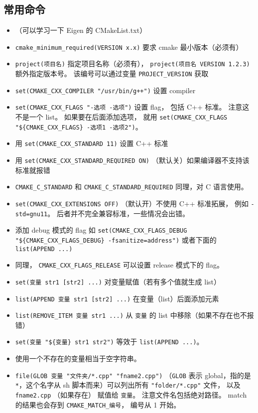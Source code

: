 \subsection{常用命令}
\begin{itemize}
\item （可以学习一下 Eigen 的 CMakeList.txt）
\item \verb`cmake_minimum_required(VERSION x.x)` 要求 cmake 最小版本（必须有）
\item \verb`project(项目名)` 指定项目名称（必须有）， \verb`project(项目名 VERSION 1.2.3)` 额外指定版本号。 该编号可以通过变量 \verb`PROJECT_VERSION` 获取
\item \verb`set(CMAKE_CXX_COMPILER "/usr/bin/g++")` 设置 compiler
\item \verb`set(CMAKE_CXX_FLAGS "-选项 -选项")` 设置 flag， 包括 C++ 标准。 注意这不是一个 list。 如果要在后面添加选项， 就用 \verb`set(CMAKE_CXX_FLAGS "${CMAKE_CXX_FLAGS} -选项1 -选项2")`。
\item 用 \verb`set(CMAKE_CXX_STANDARD 11)` 设置 C++ 标准
\item 用 \verb`set(CMAKE_CXX_STANDARD_REQUIRED ON)` （默认关）如果编译器不支持该标准就报错
\item \verb`CMAKE_C_STANDARD` 和 \verb`CMAKE_C_STANDARD_REQUIRED` 同理，对 C 语言使用。
\item \verb`set(CMAKE_CXX_EXTENSIONS OFF)` （默认开）不使用 C++ 标准拓展， 例如 \verb`-std=gnu11`。 后者并不完全兼容标准，一些情况会出错。
\item 添加 debug 模式的 flag 如 \verb`set(CMAKE_CXX_FLAGS_DEBUG "${CMAKE_CXX_FLAGS_DEBUG} -fsanitize=address")` 或者下面的 \verb`list(APPEND ...)`
\item 同理， \verb`CMAKE_CXX_FLAGS_RELEASE` 可以设置 release 模式下的 flag。
\item \verb`set(变量 str1 [str2] ...)` 对变量赋值（若有多个值就生成 list）
\item \verb`list(APPEND 变量 str1 [str2] ...)` 在变量（list）后面添加元素
\item \verb`list(REMOVE_ITEM 变量 str1 ...)` 从 \verb`变量` 的 list 中移除（如果不存在也不报错）
\item \verb`set(变量 "${变量} str1 str2")` 等效于 \verb`list(APPEND ...)`。
\item 使用一个不存在的变量相当于空字符串。
\item \verb`file(GLOB 变量 "文件夹/*.cpp" "fname2.cpp")` （\verb`GLOB` 表示 global，指的是 \verb`*`，这个名字从 sh 脚本而来）可以列出所有 \verb`"folder/*.cpp"` 文件， 以及 \verb`fname2.cpp` （如果存在） 赋值给 \verb`变量`。 注意文件名包括绝对路径。 match 的结果也会存到 \verb`CMAKE_MATCH_编号`， 编号从 1 开始。

\end{itemize}
